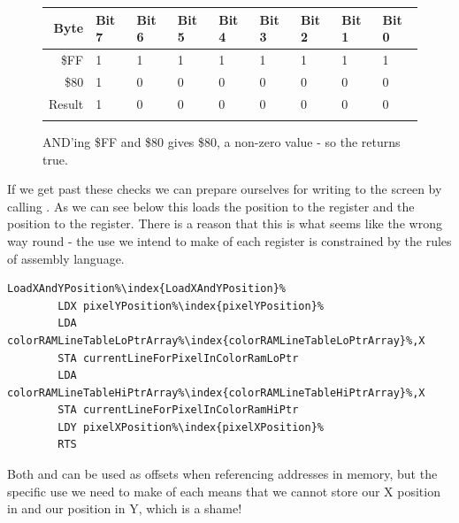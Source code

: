 \begin{figure}[H]
  {
    \setlength{\tabcolsep}{3.0pt}
    \setlength\cmidrulewidth{\heavyrulewidth} %
    \begin{adjustbox}{width=7cm,center}

      \begin{tabular}{rllllllll}
        \toprule
        Byte & Bit 7 & Bit 6 & Bit 5 & Bit 4 & Bit 3 & Bit 2 & Bit 1 & Bit 0        \\
        \midrule
        \$FF & 1 & 1 & 1 & 1 & 1 & 1 & 1 & 1 \\
        \$80 & 1 & 0 & 0 & 0 & 0 & 0 & 0 & 0 \\
        \midrule
        Result & 1 & 0 & 0 & 0 & 0 & 0 & 0 & 0 \\
        \addlinespace
        \bottomrule
      \end{tabular}
    \end{adjustbox}
    }\caption*{AND'ing \$FF and \$80 gives \$80, a non-zero value - so the  returns true.}
\end{figure}

If we get past these checks we can prepare ourselves for writing to the screen by calling . As we can
see below this loads the  position to the  register and the  position to the  register. There
is a reason that this is what seems like the wrong way round - the use we intend to make of each register is constrained by the
rules of assembly language. 

\begin{lstlisting}[escapechar=\%]
LoadXAndYPosition%\index{LoadXAndYPosition}%   
        LDX pixelYPosition%\index{pixelYPosition}%
        LDA colorRAMLineTableLoPtrArray%\index{colorRAMLineTableLoPtrArray}%,X
        STA currentLineForPixelInColorRamLoPtr
        LDA colorRAMLineTableHiPtrArray%\index{colorRAMLineTableHiPtrArray}%,X
        STA currentLineForPixelInColorRamHiPtr
        LDY pixelXPosition%\index{pixelXPosition}%
        RTS 
\end{lstlisting}
Both  and  can be used as offsets when referencing addresses in memory, but the specific use
we need to make of each means that we cannot store our X position in  and our  position in Y, which is a shame!

